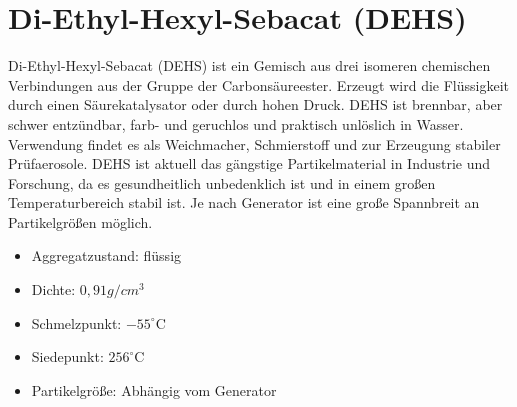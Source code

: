 \section{Di-Ethyl-Hexyl-Sebacat (DEHS)}
Di-Ethyl-Hexyl-Sebacat (DEHS) ist ein Gemisch aus drei isomeren chemischen Verbindungen aus der Gruppe der Carbons\"{a}ureester. Erzeugt wird die Fl\"{u}ssigkeit durch einen S\"{a}urekatalysator oder durch hohen Druck. DEHS ist brennbar, aber schwer entz\"{u}ndbar, farb- und geruchlos und praktisch unl\"{o}slich in Wasser. Verwendung findet es als Weichmacher, Schmierstoff und zur Erzeugung stabiler Pr\"{u}faerosole. DEHS ist aktuell das g\"{a}ngstige Partikelmaterial in Industrie und Forschung, da es gesundheitlich unbedenklich ist und in einem gro{\ss}en Temperaturbereich stabil ist. Je nach Generator ist eine gro{\ss}e Spannbreit an Partikelgr\"{o}{\ss}en m\"{o}glich.
\begin{itemize}
\item Aggregatzustand: fl\"{u}ssig
\item Dichte: \(0,91 g/cm^3\)
\item Schmelzpunkt: \(-55^\circ\text{C}\)
\item Siedepunkt: \(256^\circ\text{C}\)
\item Partikelgr\"{o}{\ss}e: Abh\"{a}ngig vom Generator
\end{itemize}